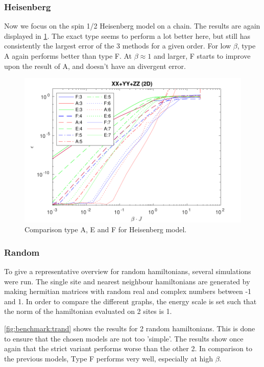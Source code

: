 \subsubsection{Heisenberg}

Now we focus on the spin 1/2 Heisenberg model on a chain. The results are again displayed in \cref{fig:benchmark:tHeisenberg}. The exact type seems to perform a lot better here, but still has consistently the largest error of the 3 methods for a given order. For low $\beta$, type A again performs better than type F. At $\beta \approx 1$ and larger, F starts to improve upon the result of A, and doesn't have an divergent error.

\begin{figure}
    \center
    \includegraphics[width=\textwidth]{Figuren/benchmarking/t_heis_XXX.pdf}
    \caption{Comparison type A, E and F for Heisenberg model.}
    \label{fig:benchmark:tHeisenberg}
\end{figure}

\subsubsection{Random}

To give a representative overview for random hamiltonians, several simulations were run. The single site and nearest neighbour hamiltonians are generated by making hermitian matrices with random real and complex numbers between -1 and 1. In order to compare the different graphs, the energy scale is set such that the norm of the hamiltonian evaluated on 2 sites is 1.

\cref{fig:benchmark:trand} shows the results for 2 random hamiltonians. This is done to ensure that the chosen models are not too 'simple'. The results show once again that the strict variant performs worse than the other 2. In comparison to the previous models, Type F performs very well, especially at high $\beta$.

